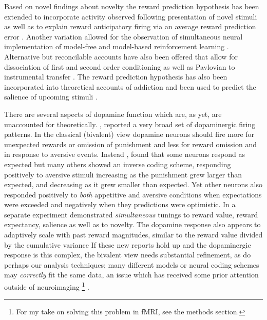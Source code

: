 \documentclass[doc,12pt]{apa}        %
\begin{document}
Based on novel findings about novelty \cite{Bunzeck:2006p5319, Blatter:2006p6372, GuitartMasip:2010p7244} the reward prediction hypothesis has been extended to incorporate activity observed following presentation of novel stimuli \cite{Kakade:2002p6414} as well as to explain reward anticipatory firing via an average reward prediction error \cite{Knutson:2007p1687}. Another variation allowed for the observation of simultaneous neural implementation of model-free and model-based reinforcement learning \cite{Smith:2006p7627, Daw:2011p7995}. Alternative but reconcilable accounts have also been offered that allow for dissociation of first and second order conditioning as well as Pavlovian to instrumental transfer \cite{OReilly:2007p827}. The reward prediction hypothesis has also been incorporated into theoretical accounts of addiction \cite{Redish:2004p2531} and been used to predict the salience of upcoming stimuli \cite{Behrens:2007p8839}.   

There are several aspects of dopamine function which are, as yet, are unaccounted for theoretically.  , reported a very broad set of dopaminergic firing patterns. In the classical (bivalent) view dopamine neurons should fire more for unexpected rewards or omission of punishment and less for reward omission and in response to aversive events.   Instead , found that some neurons respond as expected but many others showed an inverse coding scheme, responding positively to aversive stimuli increasing as the punishment grew larger than expected, and decreasing as it grew smaller than expected.  Yet other neurons also responded positively to \emph{both} appetitive and aversive conditions when expectations were exceeded and negatively when they predictions were optimistic.  In a separate experiment  demonstrated \emph{simultaneous} tunings to reward value, reward expectancy, salience as well as to novelty.   The dopamine response also appears to adaptively scale with past reward magnitudes, similar to the reward value divided by the cumulative variance \cite{Tobler:2005p6373}  If these new reports hold up and the dopaminergic response is this complex, the bivalent view needs substantial refinement, as do perhaps our analysis techniques; many different models or neural coding schemes may \emph{correctly} fit the same data, an issue which has received some prior attention outside of neuroimaging
\footnote{
    For my take on solving this problem in fMRI, see the methods section.
} \cite{Chamberlin:1965p8873}.
\end{document}
